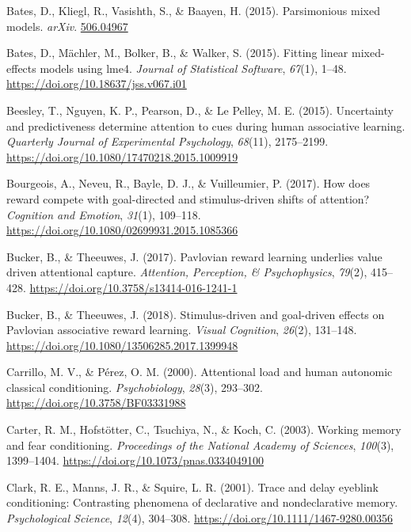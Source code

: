 \documentclass[
  man,
  floatsintext,
  longtable,
  nolmodern,
  notxfonts,
  notimes,
  mask,
  colorlinks=true,linkcolor=blue,citecolor=blue,urlcolor=blue]{apa7}
\newlength{\cslhangindent}
\newenvironment{CSLReferences}[2] %
 {\begin{list}{}{%
  \setlength{\itemindent}{0pt}
  \setlength{\leftmargin}{0pt}
  \setlength{\parsep}{0pt}
  \ifodd #1
   \setlength{\leftmargin}{\cslhangindent}
   \setlength{\itemindent}{-1\cslhangindent}
  \fi
  \setlength{\itemsep}{#2\baselineskip}}}
 {\end{list}}
\begin{document}
\begin{CSLReferences}{1}{0}
Bates, D., Kliegl, R., Vasishth, S., \& Baayen, H. (2015). Parsimonious
mixed models. \emph{arXiv}. \href{https://506.04967}{506.04967}

Bates, D., Mächler, M., Bolker, B., \& Walker, S. (2015). Fitting linear
mixed-effects models using {lme4}. \emph{Journal of Statistical
Software}, \emph{67}(1), 1--48.
\url{https://doi.org/10.18637/jss.v067.i01}

Beesley, T., Nguyen, K. P., Pearson, D., \& Le Pelley, M. E. (2015).
Uncertainty and predictiveness determine attention to cues during human
associative learning. \emph{Quarterly Journal of Experimental
Psychology}, \emph{68}(11), 2175--2199.
\url{https://doi.org/10.1080/17470218.2015.1009919}

Bourgeois, A., Neveu, R., Bayle, D. J., \& Vuilleumier, P. (2017). How
does reward compete with goal-directed and stimulus-driven shifts of
attention? \emph{Cognition and Emotion}, \emph{31}(1), 109--118.
\url{https://doi.org/10.1080/02699931.2015.1085366}

Bucker, B., \& Theeuwes, J. (2017). Pavlovian reward learning underlies
value driven attentional capture. \emph{Attention, Perception, \&
Psychophysics}, \emph{79}(2), 415--428.
\url{https://doi.org/10.3758/s13414-016-1241-1}

Bucker, B., \& Theeuwes, J. (2018). Stimulus-driven and goal-driven
effects on {Pavlovian} associative reward learning. \emph{Visual
Cognition}, \emph{26}(2), 131--148.
\url{https://doi.org/10.1080/13506285.2017.1399948}

Carrillo, M. V., \& Pérez, O. M. (2000). Attentional load and human
autonomic classical conditioning. \emph{Psychobiology}, \emph{28}(3),
293--302. \url{https://doi.org/10.3758/BF03331988}

Carter, R. M., Hofstötter, C., Tsuchiya, N., \& Koch, C. (2003). Working
memory and fear conditioning. \emph{Proceedings of the National Academy
of Sciences}, \emph{100}(3), 1399--1404.
\url{https://doi.org/10.1073/pnas.0334049100}

Clark, R. E., Manns, J. R., \& Squire, L. R. (2001). Trace and delay
eyeblink conditioning: Contrasting phenomena of declarative and
nondeclarative memory. \emph{Psychological Science}, \emph{12}(4),
304--308. \url{https://doi.org/10.1111/1467-9280.00356}


\end{CSLReferences}
\end{document}
